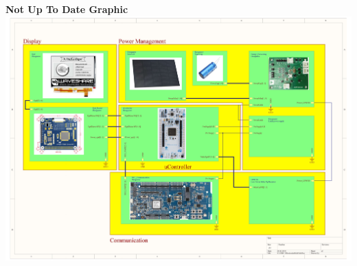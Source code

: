 

\textbf{Not Up To Date Graphic}\\

\includegraphics[scale=0.5]{5-development/overview/graphics/Blockschaltbild.pdf}
